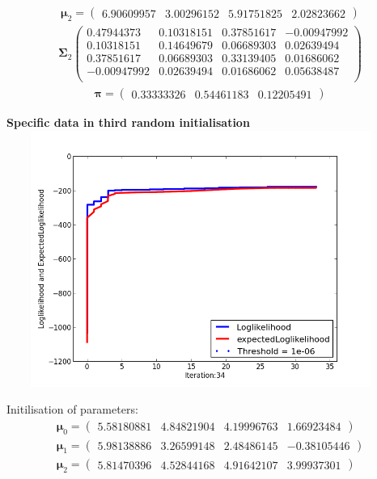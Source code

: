 \documentclass[11pt,a4paper]{article}
\newcommand{\htab}{\hspace*{0.63cm}}
\newcommand{\bs}[1]{\boldsymbol{#1}}
\begin{document}
    \begin{align} \bs{\mu}_{2} = \begin{pmatrix} 
        6.90609957 & 3.00296152 & 5.91751825 & 2.02823662 
    \end{pmatrix}  \end{align}\vspace{-1cm} 
    \begin{align} \bs{\Sigma}_{2}\begin{pmatrix} 
        0.47944373 & 0.10318151 & 0.37851617 & -0.00947992 \\ 
        0.10318151 & 0.14649679 & 0.06689303 & 0.02639494 \\ 
        0.37851617 & 0.06689303 & 0.33139405 & 0.01686062 \\ 
        -0.00947992 & 0.02639494 & 0.01686062 & 0.05638487 \\ 
    \end{pmatrix} \end{align}
    \begin{align}  \bs{\pi} = \begin{pmatrix}
        0.33333326 & 0.54461183 & 0.12205491
    \end{pmatrix} \end{align}
\newpage
    \begin{center}
        \textbf{Specific data in third random initialisation}
        \includegraphics[width=5in,height=3.3in]{./Result/figure_3.png}
    \end{center}
    \htab Initilisation of parameters:
    \begin{align} 
        \bs{\mu}_{0} = \begin{pmatrix} 
            5.58180881 & 4.84821904 & 4.19996763 & 1.66923484 
        \end{pmatrix}   \\
        \bs{\mu}_{1} = \begin{pmatrix} 
            5.98138886 & 3.26599148 & 2.48486145 & -0.38105446 
        \end{pmatrix}    \\
        \bs{\mu}_{2} = \begin{pmatrix} 
            5.81470396 & 4.52844168 & 4.91642107 & 3.99937301 
        \end{pmatrix}  \end{align} \vspace{-1cm}
\end{document}
